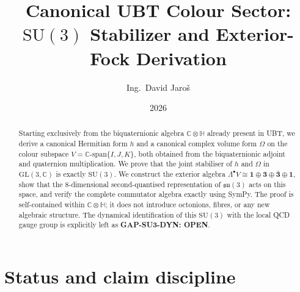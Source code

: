 \documentclass[12pt,a4paper]{article}
\title{\textbf{Canonical UBT Colour Sector: \\
         $\mathrm{SU}(3)$ Stabilizer and Exterior-Fock Derivation}}
\author{Ing.\ David Jaro\v{s}}
\date{2026}
\theoremstyle{definition}
\theoremstyle{remark}
\begin{document}
  \maketitle

\begin{abstract}
Starting exclusively from the biquaternionic algebra $\mathbb{C}\otimes\mathbb{H}$
already present in UBT, we derive a canonical Hermitian form $h$ and a canonical
complex volume form $\Omega$ on the colour subspace
$V = \mathbb{C}\text{-span}\{I,J,K\}$, both obtained from the biquaternionic
adjoint and quaternion multiplication.  We prove that the joint stabiliser of
$h$ and $\Omega$ in $\mathrm{GL}(3,\mathbb{C})$ is exactly $\mathrm{SU}(3)$.
We construct the exterior algebra $\Lambda^\bullet V \cong \mathbf{1}\oplus\mathbf{3}
\oplus\bar{\mathbf{3}}\oplus\mathbf{1}$, show that the $8$-dimensional
second-quantised representation of $\mathfrak{su}(3)$ acts on this space, and
verify the complete commutator algebra exactly using SymPy.
The proof is self-contained within $\mathbb{C}\otimes\mathbb{H}$; it does not
introduce octonions, fibres, or any new algebraic structure.
The dynamical identification of this $\mathrm{SU}(3)$ with the local QCD
gauge group is explicitly left as \textbf{GAP-SU3-DYN: OPEN}.
\end{abstract}
\fi

\section{Status and claim discipline}
\label{sec:status}
\end{document}
